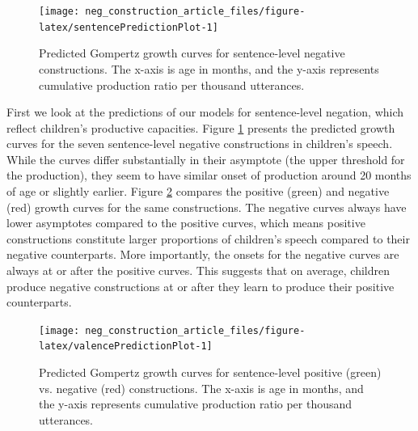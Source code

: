 \documentclass[
  man,floatsintext]{apa6}
\begin{document}
\begin{figure}[H]

{\centering \texttt{[image: neg\_construction\_article\_files/figure-latex/sentencePredictionPlot-1]} 

}

\caption{Predicted Gompertz growth curves for sentence-level negative constructions. The x-axis is age in months, and the y-axis represents cumulative production ratio per thousand utterances.}\label{fig:sentencePredictionPlot}
\end{figure}

First we look at the predictions of our models for sentence-level negation, which reflect children's productive capacities. Figure \ref{fig:sentencePredictionPlot} presents the predicted growth curves for the seven sentence-level negative constructions in children's speech. While the curves differ substantially in their asymptote (the upper threshold for the production), they seem to have similar onset of production around 20 months of age or slightly earlier. Figure \ref{fig:valencePredictionPlot} compares the positive (green) and negative (red) growth curves for the same constructions. The negative curves always have lower asymptotes compared to the positive curves, which means positive constructions constitute larger proportions of children's speech compared to their negative counterparts. More importantly, the onsets for the negative curves are always at or after the positive curves. This suggests that on average, children produce negative constructions at or after they learn to produce their positive counterparts.

\begin{figure}[H]

{\centering \texttt{[image: neg\_construction\_article\_files/figure-latex/valencePredictionPlot-1]} 

}

\caption{Predicted Gompertz growth curves for sentence-level positive (green) vs. negative (red) constructions. The x-axis is age in months, and the y-axis represents cumulative production ratio per thousand utterances.}\label{fig:valencePredictionPlot}
\end{figure}
\end{document}
